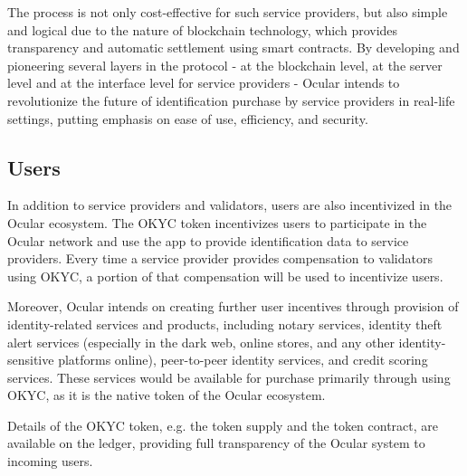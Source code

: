 \documentclass[a4paper]{article}
\begin{document}
The process is not only cost-effective for such service providers, but also simple and logical due to the nature of blockchain technology, which provides transparency and automatic settlement using smart contracts. By developing and pioneering several layers in the protocol - at the blockchain level, at the server level and at the interface level for service providers - Ocular intends to revolutionize the future of identification purchase by service providers in real-life settings, putting emphasis on ease of use, efficiency, and security.

\subsection{Users}
In addition to service providers and validators, users are also incentivized in the Ocular ecosystem. The OKYC token incentivizes users to participate in the Ocular network and use the app to provide identification data to service providers. Every time a service provider provides compensation to validators using OKYC, a portion of that compensation will be used to incentivize users.

Moreover, Ocular intends on creating further user incentives through provision of identity-related services and products, including notary services, identity theft alert services (especially in the dark web, online stores, and any other identity-sensitive platforms online), peer-to-peer identity services, and credit scoring services. These services would be available for purchase primarily through using OKYC, as it is the native token of the Ocular ecosystem.

Details of the OKYC token, e.g. the token supply and the token contract, are available on the ledger, providing full transparency of the Ocular system to incoming users. 
\end{document}
